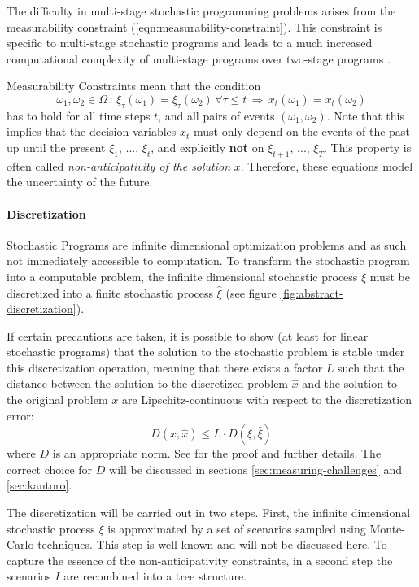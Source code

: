 The difficulty in multi-stage stochastic programming problems arises from the measurability constraint (\ref{eqn:measurability-constraint}).
This constraint is specific to multi-stage stochastic programs and leads to a much increased computational complexity of multi-stage programs over two-stage programs \cite{Shapiro2005,Shapiro2008}.
% 
\par{Measurability Constraints} 
mean that the condition
\begin{equation}
  \label{eq:mathematical-NAC}
  \omega_1,\omega_2\in \Omega \, : \, \xi_\tau(\omega_1) = \xi_\tau(\omega_2)\,\forall \tau\leq t\,\Rightarrow \, x_t(\omega_1) = x_t(\omega_2) 
\end{equation}
has to hold for all time steps $t$, and all pairs of events $(\omega_1,\omega_2)$. 
Note that this implies that the decision variables $x_t$ must only depend on the events of the past up until the present $\xi_1$, ..., $\xi_t$, and explicitly \textbf{not} on $\xi_{t+1},\, ...,\,\xi_T$. 
This property is often called \textit{non-anticipativity of the solution} $x$. 
Therefore, these equations model the uncertainty of the future.
% 
\paragraph{Discretization}
% 
Stochastic Programs are infinite dimensional optimization problems and as such not immediately accessible to computation.
To transform the stochastic program into a computable problem, the infinite dimensional stochastic process $\xi$ must be discretized into a finite stochastic process $\hat{\xi}$ (see figure \ref{fig:abstract-discretization}). 

If certain precautions are taken, it is possible to show (at least for linear stochastic programs) that the solution to the stochastic problem is stable under this discretization operation, meaning that there exists a factor $L$ such that the distance between the solution to the discretized problem $\hat{x}$ and the solution to the original problem $x$ are Lipschitz-continuous with respect to the discretization error:
\begin{equation}
  D(x , \hat{x}) \leq L\cdot D(\xi,\hat{\xi})
\end{equation}
where $D$ is an appropriate norm. See \cite{Heitsch2010} for the proof and further details. The correct choice for $D$ will be discussed in sections \ref{sec:measuring-challenges} and \ref{sec:kantoro}.

The discretization will be carried out in two steps. 
First, the infinite dimensional stochastic process $\xi$ is approximated by a set of scenarios sampled using Monte-Carlo techniques. 
This step is well known and will not be discussed here. 
To capture the essence of the non-anticipativity constraints, in a second step the scenarios $I$ are recombined into a tree structure. 

